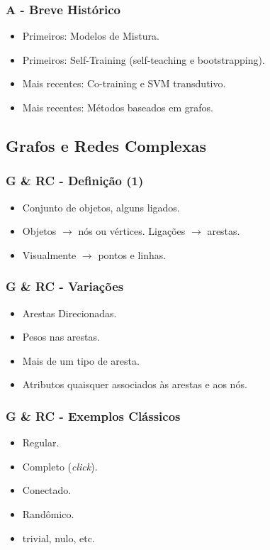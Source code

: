 \documentclass{beamer}
\begin{document}
      \frame
      {
        \frametitle{A - Breve Histórico}
        \begin{itemize}
          \item <1-> Primeiros: Modelos de Mistura.
          \item <2-> Primeiros: Self-Training (self-teaching e bootstrapping).
          \item <3-> Mais recentes: Co-training e SVM transdutivo.
          \item <4-> Mais recentes: Métodos baseados em grafos.
        \end{itemize}
      }

    \subsection{Grafos e Redes Complexas}
      \frame{\tableofcontents[current]}

      \frame
      {
        \frametitle{G \& RC - Definição (1)}
        \begin{itemize}
          \item <1-> Conjunto de objetos, alguns ligados.
          \item <2-> Objetos $\rightarrow$ nós ou vértices. Ligações $\rightarrow$ arestas.
          \item <3-> Visualmente $\rightarrow$ pontos e linhas.
        \end{itemize}
      }

      \frame
      {
        \frametitle{G \& RC - Variações}
        \begin{itemize}
          \item <1-> Arestas Direcionadas.
          \item <2-> Pesos nas arestas.
          \item <3-> Mais de um tipo de aresta.
          \item <4-> Atributos quaisquer associados às arestas e aos nós.
        \end{itemize}
      }

      \frame
      {
        \frametitle{G \& RC - Exemplos Clássicos}
        \begin{itemize}
          \item <1-> Regular.
          \item <2-> Completo (\emph{click}).
          \item <3-> Conectado.
          \item <4-> Randômico.
          \item <5-> trivial, nulo, etc.
        \end{itemize}
      }
\end{document}
